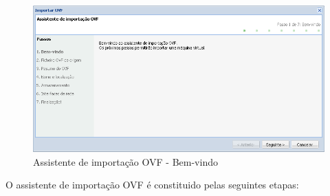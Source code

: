 \begin{figure}[H]
	\begin{center}
	\includegraphics[scale=0.5]{screenshots/ovf_import.png}
	\caption{Assistente de importação OVF - Bem-vindo}
	\label{fig:ovf_import_wiz}
	\end{center}
\end{figure}

O assistente de importação OVF é constituido pelas seguintes etapas:

